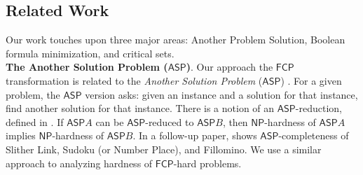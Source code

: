 \documentclass[runningheads,a4paper]{llncs}
\begin{document}
%
%
%
%

\subsection{Related Work}
\label{sec:relatedwork}

Our work touches upon three major areas: Another Problem Solution, Boolean formula minimization, and critical sets. \\

\noindent\textbf{The Another Solution Problem ($\mathsf{ASP}$)}. Our approach the $\mathsf{FCP}$ transformation is related to the \emph{Another Solution Problem} ($\mathsf{ASP}$) \cite{Seta01}. For a given problem, the $\mathsf{ASP}$ version asks: given an instance and a solution for that instance, find another solution for that instance. There is a notion of an $\mathsf{ASP}$-reduction, defined in \cite{Seta01}. If $\mathsf{ASP} A$ can be $\mathsf{ASP}$-reduced to $\mathsf{ASP} B$, then $\mathsf{NP}$-hardness of $\mathsf{ASP} A$ implies $\mathsf{NP}$-hardness of $\mathsf{ASP} B$. In a follow-up paper, \cite{takayuki2003complexity} shows $\mathsf{ASP}$-completeness of Slither Link, Sudoku (or Number Place), and Fillomino. We use a similar approach to analyzing hardness of $\mathsf{FCP}$-hard problems. 
\end{document}
